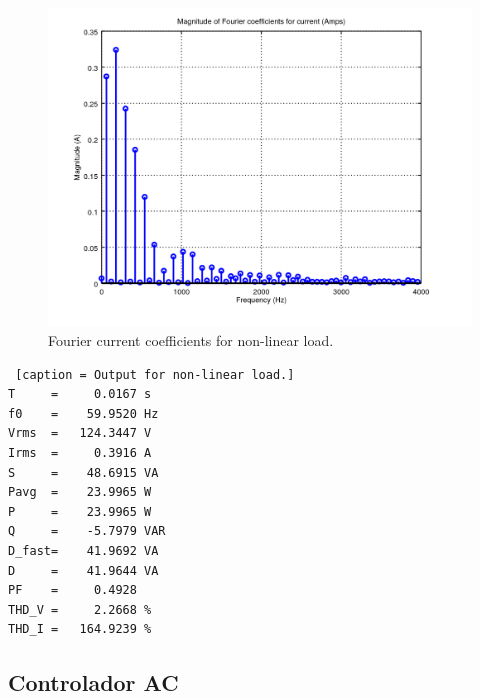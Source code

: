\documentclass[journal]{IEEEtran}
\begin{document}
\begin{figure}[h]
\centering
\includegraphics[clip,width=\columnwidth]
{zoomed_current_furier_coefficients_computer.png}
\caption{Fourier current coefficients for non-linear load.}
\label{fourier_corrent_coefficients_nonlinear}
\end{figure}


\begin{lstlisting} [caption = Output for non-linear load.]
T     =     0.0167 s 
f0    =    59.9520 Hz 
Vrms  =   124.3447 V
Irms  =     0.3916 A
S     =    48.6915 VA
Pavg  =    23.9965 W 
P     =    23.9965 W 
Q     =    -5.7979 VAR 
D_fast=    41.9692 VA 
D     =    41.9644 VA 
PF    =     0.4928 
THD_V =     2.2668 %
THD_I =   164.9239 %
\end{lstlisting}

\subsection{Controlador AC}


\end{document}
